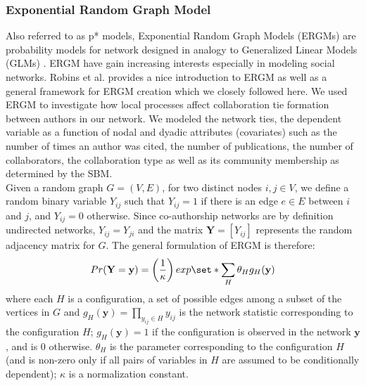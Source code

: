 \subsubsection{Exponential Random Graph Model}
\label{sec:methods_ergm}
Also referred to as p* models, Exponential Random Graph Models (ERGMs) are probability models for network designed in analogy to Generalized Linear Models (GLMs) \cite{kolaczyk_statistical_2014}. ERGM have gain increasing interests especially in modeling social networks. Robins et al. \cite{robins_introduction_2007} provides a nice introduction to ERGM as well as a general framework for ERGM creation which we closely followed here. We used ERGM to investigate how local processes affect collaboration tie formation between authors in our network. We modeled the network ties, the dependent variable as a function of nodal and dyadic attributes (covariates) such as the number of times an author was cited, the number of publications, the number of collaborators, the collaboration type as well as its community membership as determined by the SBM. \\
Given a random graph $G=(V,E)$, for two distinct nodes $i,j \in V$, we define a random binary variable $Y_{ij}$ such that $Y_{ij}=1$ if there is an edge $e \in E$ between $i$ and $j$, and $Y_{ij}=0$ otherwise. Since co-authorship networks are by definition undirected networks, $Y_{ij}=Y_{ji}$ and the matrix $\mathbf{Y}=\left[Y_{ij}\right]$ represents the random adjacency matrix for $G$. The general formulation of ERGM is therefore:
\begin{equation}
Pr(\mathbf{Y}=\mathbf{y})=\left( \frac{1}{\kappa} \right) exp \set*{ \sum_{H} \theta_H g_H(\mathbf{y})}
\end{equation}
where each $H$ is a configuration, a set of possible edges among a subset of the vertices in $G$ and $g_H(\mathbf{y})=\prod_{y_{ij} \in H}y_{ij}$ is the network statistic corresponding to the configuration $H$; $g_H(\mathbf{y})=1$ if the configuration is observed in the network $\mathbf{y}$, and is $0$ otherwise. $\theta_H$ is the parameter corresponding to the configuration $H$ (and is non-zero only if all pairs of variables in $H$ are assumed to be conditionally dependent); $\kappa$ is a normalization constant.\\
